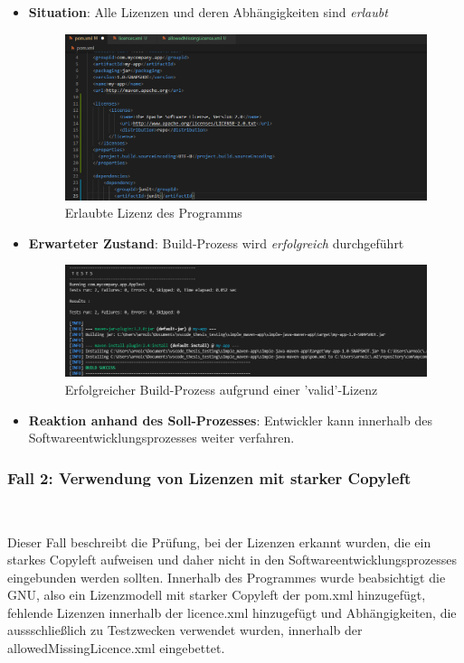 \begin{itemize}
    \item \textbf{Situation}: Alle Lizenzen und deren Abhängigkeiten sind \textit{erlaubt}
    
    \begin{figure}[h]
        \centering
        \includegraphics[scale=0.5]{Bilder/Fall1Situation.png}
        \caption{Erlaubte Lizenz des Programms}
    \end{figure}

    \item \textbf{Erwarteter Zustand}: Build-Prozess wird \textit{erfolgreich} durchgeführt 
    
    \begin{figure}[h]
        \centering
        \includegraphics[scale=0.5]{Bilder/Fall1Zustand.png}
        \caption{Erfolgreicher Build-Prozess aufgrund einer 'valid'-Lizenz}
    \end{figure}

    \item \textbf{Reaktion anhand des Soll-Prozesses}: Entwickler kann innerhalb des Softwareentwicklungsprozesses weiter verfahren. 
\end{itemize}

\subsubsection{Fall 2: Verwendung von Lizenzen mit starker Copyleft} $~$

Dieser Fall beschreibt die Prüfung, bei der Lizenzen erkannt wurden, die ein starkes Copyleft aufweisen und daher nicht in den Softwareentwicklungsprozesses eingebunden werden sollten. Innerhalb des Programmes wurde beabsichtigt die GNU, also ein Lizenzmodell mit starker Copyleft der pom.xml hinzugefügt, fehlende Lizenzen innerhalb der licence.xml hinzugefügt und Abhängigkeiten, die aussschließlich zu Testzwecken verwendet wurden, innerhalb der allowedMissingLicence.xml eingebettet. 

